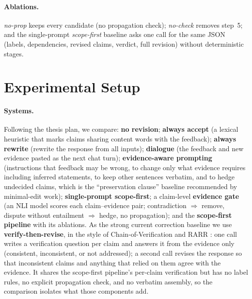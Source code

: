 \paragraph{Ablations.} \emph{no-prop} keeps every \Pp{} candidate (no propagation check); \emph{no-check} removes step~5; and the single-prompt \emph{scope-first} baseline asks one call for the same JSON (labels, dependencies, revised claims, verdict, full revision) without deterministic stages.

\section{Experimental Setup}
\label{sec:setup}
\paragraph{Systems.} Following the thesis plan, we compare: \textbf{no revision}; \textbf{always accept} (a lexical heuristic that marks claims sharing content words with the feedback); \textbf{always rewrite} (rewrite the response from all inputs); \textbf{dialogue} (the feedback and new evidence pasted as the next chat turn); \textbf{evidence-aware prompting} (instructions that feedback may be wrong, to change only what evidence requires including inferred statements, to keep other sentences verbatim, and to hedge undecided claims, which is the ``preservation clause'' baseline recommended by minimal-edit work); \textbf{single-prompt scope-first}; a claim-level \textbf{evidence gate} (an NLI model scores each claim--evidence pair; contradiction $\Rightarrow$ remove, dispute without entailment $\Rightarrow$ hedge, no propagation); and the \textbf{scope-first pipeline} with its ablations. As the strong current correction baseline we use \textbf{verify-then-revise}, in the style of Chain-of-Verification and RARR \citep{dhuliawala2024cove,gao2023rarr}: one call writes a verification question per claim and answers it from the evidence only (consistent, inconsistent, or not addressed); a second call revises the response so that inconsistent claims and anything that relied on them agree with the evidence. It shares the scope-first pipeline's per-claim verification but has no label rules, no explicit propagation check, and no verbatim assembly, so the comparison isolates what those components add.

